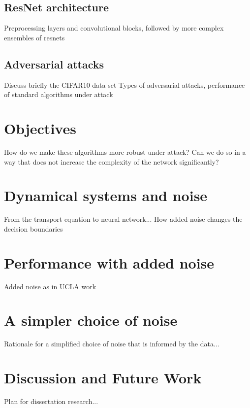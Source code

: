 \documentclass[12pt]{article}
\begin{document}
\subsection{ResNet architecture}
Preprocessing layers and convolutional blocks, followed by more complex ensembles of resnets
\subsection{Adversarial attacks}
Discuss briefly the CIFAR10 data set
Types of adversarial attacks, performance of standard algorithms under attack
\section{Objectives}
How do we make these algorithms more robust under attack? Can we do so in a way that does not increase the complexity of the network significantly?
\section{Dynamical systems and noise}
From the transport equation to neural network... How added noise changes the decision boundaries
\section{Performance with added noise}
Added noise as in UCLA work
\section{A simpler choice of noise}
Rationale for a simplified choice of noise that is informed by the data...
\section{Discussion and Future Work}
Plan for dissertation research...

\end{document}
